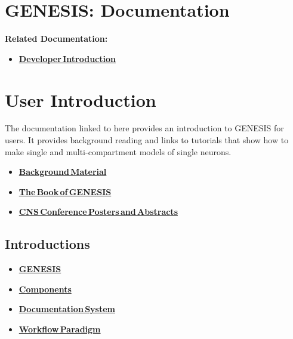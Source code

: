 \documentclass[12pt]{article}
\begin{document}
\section*{GENESIS: Documentation}

{\bf Related Documentation:}
\begin{itemize}
   \item[]\href{../developer-intro/developer-intro.tex}{\bf Developer\,Introduction}
\end{itemize}

\section*{User Introduction}

The documentation linked to here provides an introduction to GENESIS for users. It provides background reading and links to tutorials that show how to make single and multi-compartment models of single neurons.
\begin{itemize}
   \item[]\href{../background-material/background-material.tex}{\bf Background\,Material}
   \item[]\href{../book-of-genesis/book-of-genesis.tex}{\bf The\,Book\,of\,GENESIS}
   \item[]\href{../cns/cns.tex}{\bf CNS\,Conference\,Posters\,and\,Abstracts}
\end{itemize}

\subsection*{Introductions}
\begin{itemize}
   \item[]\href{../genesis-intro/genesis-intro.tex}{\bf GENESIS}
   \item[]\href{../genesis-components/genesis-components.tex}{\bf Components}
   \item[]\href{../documentation-overview/documentation-overview.tex}{\bf Documentation\,System}
   \item[]\href{../workflow-intro/workflow-intro.tex}{\bf Workflow\,Paradigm}
\end{itemize}
\end{document}
